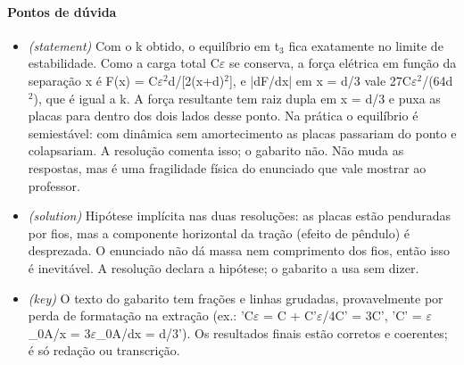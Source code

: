 \documentclass{article}%
\begin{document}
\paragraph{Pontos de dúvida}%
\begin{itemize}%
\item%
\textit{(statement)} Com o k obtido, o equilíbrio em t$_{3}$ fica exatamente no limite de estabilidade. Como a carga total C$\varepsilon$ se conserva, a força elétrica em função da separação x é F(x) = C$\varepsilon$$^2$d/{[}2(x+d)$^2${]}, e |dF/dx| em x = d/3 vale 27C$\varepsilon$$^2$/(64d$^2$), que é igual a k. A força resultante tem raiz dupla em x = d/3 e puxa as placas para dentro dos dois lados desse ponto. Na prática o equilíbrio é semiestável: com dinâmica sem amortecimento as placas passariam do ponto e colapsariam. A resolução comenta isso; o gabarito não. Não muda as respostas, mas é uma fragilidade física do enunciado que vale mostrar ao professor.%
\item%
\textit{(solution)} Hipótese implícita nas duas resoluções: as placas estão penduradas por fios, mas a componente horizontal da tração (efeito de pêndulo) é desprezada. O enunciado não dá massa nem comprimento dos fios, então isso é inevitável. A resolução declara a hipótese; o gabarito a usa sem dizer.%
\item%
\textit{(key)} O texto do gabarito tem frações e linhas grudadas, provavelmente por perda de formatação na extração (ex.: 'C$\varepsilon$ = C + C'$\varepsilon$/4C' = 3C', 'C' = $\varepsilon$\_0A/x = 3$\varepsilon$\_0A/dx = d/3'). Os resultados finais estão corretos e coerentes; é só redação ou transcrição.%
\end{itemize}%
\end{document}
